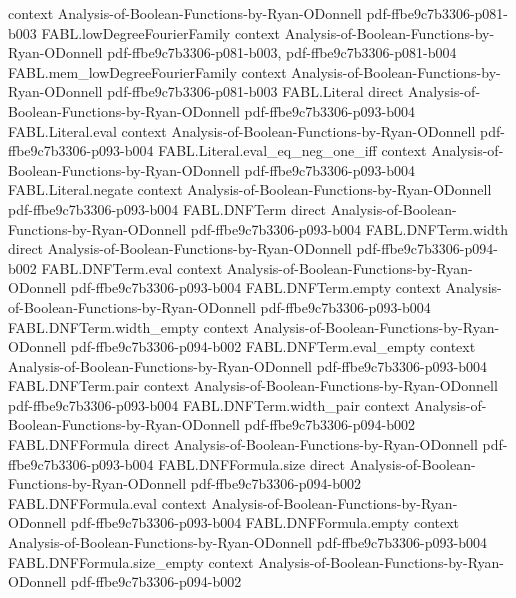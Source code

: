 \begin{theorem}
  {context}
  {Analysis-of-Boolean-Functions-by-Ryan-ODonnell}
  {pdf-ffbe9c7b3306-p081-b003}
\proofstep
  {FABL.lowDegreeFourierFamily}
  {context}
  {Analysis-of-Boolean-Functions-by-Ryan-ODonnell}
  {pdf-ffbe9c7b3306-p081-b003,
    pdf-ffbe9c7b3306-p081-b004}
\proofstep
  {FABL.mem_lowDegreeFourierFamily}
  {context}
  {Analysis-of-Boolean-Functions-by-Ryan-ODonnell}
  {pdf-ffbe9c7b3306-p081-b003}
\proofstep
  {FABL.Literal}
  {direct}
  {Analysis-of-Boolean-Functions-by-Ryan-ODonnell}
  {pdf-ffbe9c7b3306-p093-b004}
\proofstep
  {FABL.Literal.eval}
  {context}
  {Analysis-of-Boolean-Functions-by-Ryan-ODonnell}
  {pdf-ffbe9c7b3306-p093-b004}
\proofstep
  {FABL.Literal.eval_eq_neg_one_iff}
  {context}
  {Analysis-of-Boolean-Functions-by-Ryan-ODonnell}
  {pdf-ffbe9c7b3306-p093-b004}
\proofstep
  {FABL.Literal.negate}
  {context}
  {Analysis-of-Boolean-Functions-by-Ryan-ODonnell}
  {pdf-ffbe9c7b3306-p093-b004}
\proofstep
  {FABL.DNFTerm}
  {direct}
  {Analysis-of-Boolean-Functions-by-Ryan-ODonnell}
  {pdf-ffbe9c7b3306-p093-b004}
\proofstep
  {FABL.DNFTerm.width}
  {direct}
  {Analysis-of-Boolean-Functions-by-Ryan-ODonnell}
  {pdf-ffbe9c7b3306-p094-b002}
\proofstep
  {FABL.DNFTerm.eval}
  {context}
  {Analysis-of-Boolean-Functions-by-Ryan-ODonnell}
  {pdf-ffbe9c7b3306-p093-b004}
\proofstep
  {FABL.DNFTerm.empty}
  {context}
  {Analysis-of-Boolean-Functions-by-Ryan-ODonnell}
  {pdf-ffbe9c7b3306-p093-b004}
\proofstep
  {FABL.DNFTerm.width_empty}
  {context}
  {Analysis-of-Boolean-Functions-by-Ryan-ODonnell}
  {pdf-ffbe9c7b3306-p094-b002}
\proofstep
  {FABL.DNFTerm.eval_empty}
  {context}
  {Analysis-of-Boolean-Functions-by-Ryan-ODonnell}
  {pdf-ffbe9c7b3306-p093-b004}
\proofstep
  {FABL.DNFTerm.pair}
  {context}
  {Analysis-of-Boolean-Functions-by-Ryan-ODonnell}
  {pdf-ffbe9c7b3306-p093-b004}
\proofstep
  {FABL.DNFTerm.width_pair}
  {context}
  {Analysis-of-Boolean-Functions-by-Ryan-ODonnell}
  {pdf-ffbe9c7b3306-p094-b002}
\proofstep
  {FABL.DNFFormula}
  {direct}
  {Analysis-of-Boolean-Functions-by-Ryan-ODonnell}
  {pdf-ffbe9c7b3306-p093-b004}
\proofstep
  {FABL.DNFFormula.size}
  {direct}
  {Analysis-of-Boolean-Functions-by-Ryan-ODonnell}
  {pdf-ffbe9c7b3306-p094-b002}
\proofstep
  {FABL.DNFFormula.eval}
  {context}
  {Analysis-of-Boolean-Functions-by-Ryan-ODonnell}
  {pdf-ffbe9c7b3306-p093-b004}
\proofstep
  {FABL.DNFFormula.empty}
  {context}
  {Analysis-of-Boolean-Functions-by-Ryan-ODonnell}
  {pdf-ffbe9c7b3306-p093-b004}
\proofstep
  {FABL.DNFFormula.size_empty}
  {context}
  {Analysis-of-Boolean-Functions-by-Ryan-ODonnell}
  {pdf-ffbe9c7b3306-p094-b002}

\end{theorem}
